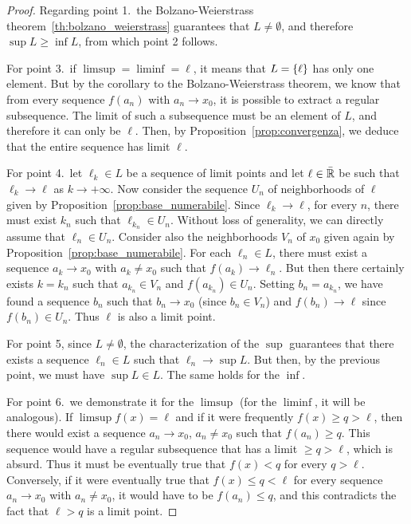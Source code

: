 %
\begin{proof}
  Regarding point 1.\
  the Bolzano-Weierstrass theorem~\ref{th:bolzano_weierstrass}
  guarantees that $L\neq \emptyset$, and
  therefore $\sup L \ge \inf L$, from which point 2 follows.

  For point 3.\ if $\limsup = \liminf = \ell$, it means that $L={\left\{ \ell \right\}}$
  has only one element. But by the corollary to the Bolzano-Weierstrass theorem,
  we know that from every sequence $f(a_n)$ with $a_n\to x_0$, 
  it is possible to extract a regular subsequence. 
  The limit of such a subsequence must be an element of $L$,
  and therefore it can only be $\ell$. 
  Then, by Proposition~\ref{prop:convergenza},
  we deduce that the entire sequence has limit $\ell$.

  For point 4.\ let $\ell_k\in L$ be a sequence of limit points
  and let $\ell\in \bar {{\mathbb R}}$ be such that $\ell_k \to \ell$ as $k\to +\infty$.
  Now consider the sequence $U_n$ of neighborhoods of $\ell$ 
  given by Proposition~\ref{prop:base_numerabile}.
  Since $\ell_k\to \ell$, for every $n$, there must exist $k_n$ such 
  that $\ell_{k_n}\in U_n$. Without loss of generality, we can 
  directly assume that $\ell_n\in U_n$.
  Consider also the neighborhoods $V_n$ of $x_0$ given again 
  by Proposition~\ref{prop:base_numerabile}.
  For each $\ell_n \in L$, there must exist a sequence $a_k\to x_0$ 
  with $a_k\neq x_0$ such that $f(a_k)\to \ell_n$.
  But then there certainly exists $k=k_n$ such that $a_{k_n}\in V_n$ 
  and $f(a_{k_n})\in U_n$. 
  Setting $b_n = a_{k_n}$, we have found a sequence $b_n$ 
  such that $b_n\to x_0$ (since $b_n\in V_n$) and $f(b_n)\to \ell$
  since $f(b_n)\in U_n$. Thus $\ell$ is also a limit point. 

  For point 5,
  since $L\neq \emptyset$, the characterization of the $\sup$
    guarantees that there exists a sequence $\ell_n\in L$ such that $\ell_n \to
  \sup L$.
  But then, by the previous point, we must have $\sup L \in L$.
  The same holds for the $\inf$.

  For point 6.\ we demonstrate it for the $\limsup$ (for the $\liminf$,
  it will be analogous). If $\limsup f(x) = \ell$ and if it were frequently
  $f(x) \ge q > \ell$, then there would exist a sequence $a_n\to x_0$, 
  $a_n\neq x_0$ such that $f(a_n)\ge q$.
  This sequence would have a regular subsequence
  that has a limit $\ge q> \ell$, which is absurd.
  Thus it must be eventually true that $f(x) < q$ for every $q>\ell$.
  Conversely, if it were eventually true that $f(x) \le q < \ell$ for every
  sequence $a_n\to x_0$ with $a_n\neq x_0$, it would have to be 
  $f(a_n) \le q$, and this contradicts the fact that $\ell>q$ 
  is a limit point.


\end{proof}
